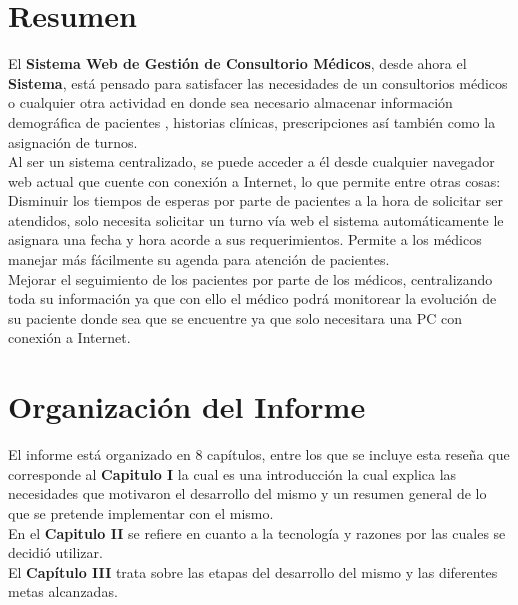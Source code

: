 \section{Resumen}

El \textbf{Sistema Web de Gestión de Consultorio Médicos}, desde ahora el \textbf{Sistema}, está pensado para satisfacer las necesidades de un consultorios médicos o cualquier otra actividad en donde sea necesario almacenar información demográfica de pacientes , historias clínicas,  prescripciones así también como la asignación de turnos.\\[0.1cm] 

Al ser un sistema centralizado, se puede acceder a él desde cualquier navegador web actual que cuente con conexión a Internet, lo que permite entre otras cosas: \\[0.1cm]

Disminuir los tiempos de esperas por parte de pacientes a la hora de solicitar ser atendidos, solo necesita solicitar un turno vía web el sistema automáticamente le asignara una fecha y hora acorde a sus requerimientos. Permite a los médicos manejar más fácilmente su agenda para atención de pacientes.\\[0.1cm]

Mejorar el seguimiento de los pacientes por parte de los médicos, centralizando toda su información ya que con ello el médico podrá monitorear la evolución de su paciente donde sea que se encuentre ya que solo necesitara una PC con conexión a Internet.\\[0.1cm] 


\section{Organización del Informe}

El informe está organizado en 8 capítulos, entre los que se incluye esta reseña que corresponde al \textbf{Capitulo I} la cual es una introducción la cual explica las necesidades que motivaron el desarrollo del mismo y un resumen general de lo que se pretende implementar con el mismo. \\[0.1cm]

En el \textbf{Capitulo II} se refiere en cuanto a la tecnología y razones por las cuales se decidió utilizar.  \\[0.1cm]

El \textbf{Capítulo III} trata sobre las etapas del desarrollo del mismo y las diferentes metas alcanzadas.\\[0.1cm]

